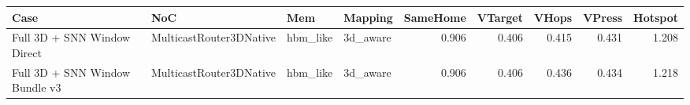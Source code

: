 \begin{tabular}{l l l l r r r r r}
\hline
Case & NoC & Mem & Mapping & SameHome & VTarget & VHops & VPress & Hotspot \\
\hline
Full 3D + SNN Window Direct & MulticastRouter3DNative & hbm\_like & 3d\_aware & 0.906 & 0.406 & 0.415 & 0.431 & 1.208 \\
Full 3D + SNN Window Bundle v3 & MulticastRouter3DNative & hbm\_like & 3d\_aware & 0.906 & 0.406 & 0.436 & 0.434 & 1.218 \\
\hline
\end{tabular}
